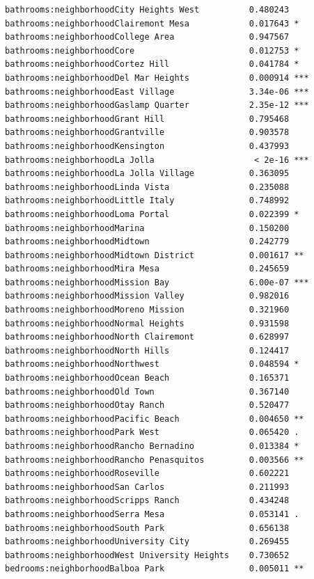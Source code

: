 \documentclass[
  letterpaper,
  DIV=11,
  numbers=noendperiod,
  oneside]{scrreprt}
\begin{document}
\begin{verbatim}
bathrooms:neighborhoodCity Heights West          0.480243    
bathrooms:neighborhoodClairemont Mesa            0.017643 *  
bathrooms:neighborhoodCollege Area               0.947567    
bathrooms:neighborhoodCore                       0.012753 *  
bathrooms:neighborhoodCortez Hill                0.041784 *  
bathrooms:neighborhoodDel Mar Heights            0.000914 ***
bathrooms:neighborhoodEast Village               3.34e-06 ***
bathrooms:neighborhoodGaslamp Quarter            2.35e-12 ***
bathrooms:neighborhoodGrant Hill                 0.795468    
bathrooms:neighborhoodGrantville                 0.903578    
bathrooms:neighborhoodKensington                 0.437993    
bathrooms:neighborhoodLa Jolla                    < 2e-16 ***
bathrooms:neighborhoodLa Jolla Village           0.363095    
bathrooms:neighborhoodLinda Vista                0.235088    
bathrooms:neighborhoodLittle Italy               0.748992    
bathrooms:neighborhoodLoma Portal                0.022399 *  
bathrooms:neighborhoodMarina                     0.150200    
bathrooms:neighborhoodMidtown                    0.242779    
bathrooms:neighborhoodMidtown District           0.001617 ** 
bathrooms:neighborhoodMira Mesa                  0.245659    
bathrooms:neighborhoodMission Bay                6.00e-07 ***
bathrooms:neighborhoodMission Valley             0.982016    
bathrooms:neighborhoodMoreno Mission             0.321960    
bathrooms:neighborhoodNormal Heights             0.931598    
bathrooms:neighborhoodNorth Clairemont           0.628997    
bathrooms:neighborhoodNorth Hills                0.124417    
bathrooms:neighborhoodNorthwest                  0.048594 *  
bathrooms:neighborhoodOcean Beach                0.165371    
bathrooms:neighborhoodOld Town                   0.367140    
bathrooms:neighborhoodOtay Ranch                 0.520477    
bathrooms:neighborhoodPacific Beach              0.004650 ** 
bathrooms:neighborhoodPark West                  0.065420 .  
bathrooms:neighborhoodRancho Bernadino           0.013384 *  
bathrooms:neighborhoodRancho Penasquitos         0.003566 ** 
bathrooms:neighborhoodRoseville                  0.602221    
bathrooms:neighborhoodSan Carlos                 0.211993    
bathrooms:neighborhoodScripps Ranch              0.434248    
bathrooms:neighborhoodSerra Mesa                 0.053141 .  
bathrooms:neighborhoodSouth Park                 0.656138    
bathrooms:neighborhoodUniversity City            0.269455    
bathrooms:neighborhoodWest University Heights    0.730652    
bedrooms:neighborhoodBalboa Park                 0.005011 ** 

\end{verbatim}
\end{document}
